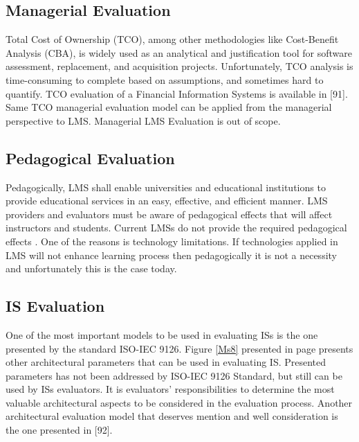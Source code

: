 \documentclass[12pt,a4paper,final,twoside,onecolumn,titlepage]{book}
\begin{document}
\subsection{Managerial Evaluation}
Total Cost of Ownership (TCO), among other methodologies like Cost-Benefit Analysis (CBA), is widely used as an analytical and justification tool for software assessment, replacement, and acquisition projects. Unfortunately, TCO analysis is time-consuming to complete based on assumptions, and sometimes hard to quantify. TCO evaluation of a Financial Information Systems is available in [91]. Same TCO managerial evaluation model can be applied from the managerial perspective to \gls{LMS}. Managerial \gls{LMS} Evaluation is out of scope.
\subsection{Pedagogical Evaluation}
Pedagogically, \gls{LMS} shall enable universities and educational institutions to provide educational services in an easy, effective, and efficient manner. \gls{LMS} providers and evaluators must be aware of pedagogical effects that will affect instructors and students. Current \gls{LMS}s do not provide the required pedagogical effects \cite{UMIS07}. One of the reasons is technology limitations. If technologies applied in \gls{LMS} will not enhance learning process then pedagogically it is not a necessity and unfortunately this is the case today.
\subsection{IS Evaluation}
One of the most important models to be used in evaluating \gls{IS}s is the one presented by the standard ISO-IEC 9126. Figure \ref{Ms8} presented in page \pageref{Ms8} presents other architectural parameters that can be used in evaluating \gls{IS}. Presented parameters has not been addressed by ISO-IEC 9126 Standard, but still can be used by \gls{IS}s evaluators. It is evaluators’ responsibilities to determine the most valuable architectural aspects to be considered in the evaluation process. Another architectural evaluation model that deserves mention and well consideration is the one presented in [92].
\end{document}
